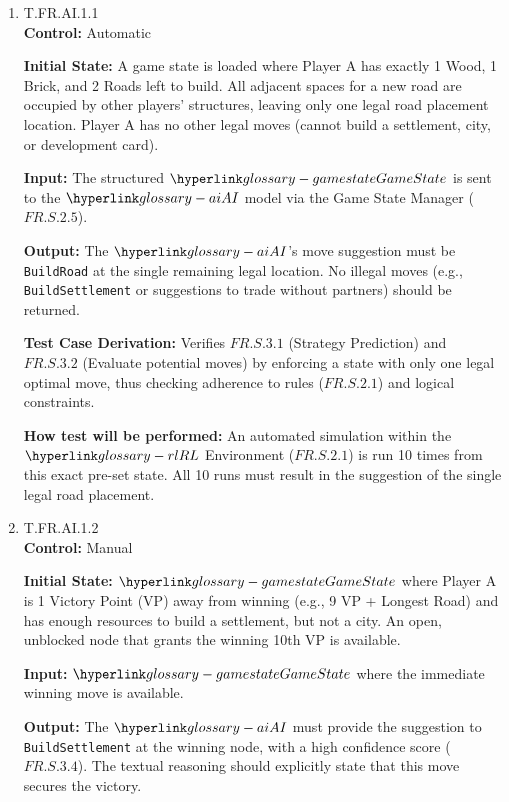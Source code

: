 \documentclass[12pt, titlepage]{article}
\begin{document}
\begin{enumerate}

\item{T.FR.AI.1.1\\}
\textbf{Control:} Automatic

\textbf{Initial State:} A game state is loaded where Player A has exactly 1 Wood, 1 Brick, and 2 Roads left to build. All adjacent spaces for a new road are occupied by other players' structures, leaving only one legal road placement location. Player A has no other legal moves (cannot build a settlement, city, or development card).

\textbf{Input:} The structured $\GameState{}$ is sent to the $\AI{}$ model via the Game State Manager ($\hyperref[FR.S.2.5]{FR.S.2.5}$).

\textbf{Output:} The $\AI{}$'s move suggestion must be \texttt{BuildRoad} at the single remaining legal location. No illegal moves (e.g., \texttt{BuildSettlement} or suggestions to trade without partners) should be returned.

\textbf{Test Case Derivation:} Verifies $\hyperref[FR.S.3.1]{FR.S.3.1}$ (Strategy Prediction) and $\hyperref[FR.S.3.2]{FR.S.3.2}$ (Evaluate potential moves) by enforcing a state with only one legal optimal move, thus checking adherence to rules ($\hyperref[FR.S.2.1]{FR.S.2.1}$) and logical constraints.

\textbf{How test will be performed:} An automated simulation within the $\RL{}$ Environment ($\hyperref[FR.S.2.1]{FR.S.2.1}$) is run 10 times from this exact pre-set state. All 10 runs must result in the suggestion of the single legal road placement.

\item{T.FR.AI.1.2\\}
\textbf{Control:} Manual

\textbf{Initial State:} $\GameState{}$ where Player A is 1 Victory Point (VP) away from winning (e.g., 9 VP + Longest Road) and has enough resources to build a settlement, but not a city. An open, unblocked node that grants the winning 10th VP is available.

\textbf{Input:} $\GameState{}$ where the immediate winning move is available.

\textbf{Output:} The $\AI{}$ must provide the suggestion to \texttt{BuildSettlement} at the winning node, with a high confidence score ($\hyperref[FR.S.3.4]{FR.S.3.4}$). The textual reasoning should explicitly state that this move secures the victory.


\end{enumerate}
\end{document}
